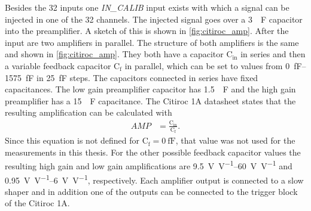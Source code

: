 Besides the 32 inputs one \textit{IN\_CALIB} input exists with which a signal can be injected in one of the 32 channels.
The injected signal goes over a \SI{3}{\piko\farad} capacitor into the preamplifier.
A sketch of this is shown in \autoref{fig:citiroc_amp}.
After the input are two amplifiers in parallel.
The structure of both amplifiers is the same and shown in \autoref{fig:citiroc_amp}.
They both have a capacitor $\text{C}_\text{in}$ in series and then a variable feedback capacitor $\text{C}_\text{f}$ in parallel, which can be set to values from \SIrange{0}{1575}{\femto\farad} in \SI{25}{\femto\farad} steps.
The capacitors connected in series have fixed capacitances.
The low gain preamplifier capacitor has \SI{1.5}{\piko\farad} and the high gain preamplifier has a \SI{15}{\piko\farad} capacitance.
The Citiroc 1A datasheet states that the resulting amplification can be calculated with
\begin{align}
	AMP &= \frac{\text{C}_\text{in}}{\text{C}_\text{f}}.
\end{align}
Since this equation is not defined for $\text{C}_\text{f}=\SI{0}{\femto\farad}$, that value was not used for the measurements in this thesis.
For the other possible feedback capacitor values the resulting high gain and low gain amplifications are \SIrange[per-mode=symbol]{9.5}{60}{\volt\per\volt} and \SIrange[per-mode=symbol]{0.95}{6}{\volt\per\volt}, respectively. 
Each amplifier output is connected to a slow shaper and in addition one of the outputs can be connected to the trigger block of the Citiroc 1A.

